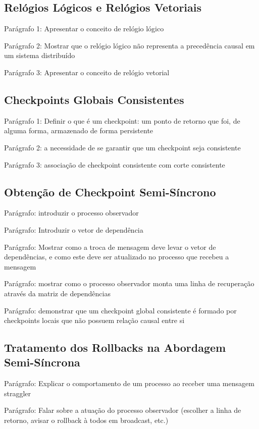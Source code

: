 \subsection{Relógios Lógicos e Relógios Vetoriais}

Parágrafo 1: Apresentar o conceito de relógio lógico

Parágrafo 2: Mostrar que o relógio lógico não representa a precedência causal em um sistema distribuído

Parágrafo 3: Apresentar o conceito de relógio vetorial

\subsection{Checkpoints Globais Consistentes}

Parágrafo 1: Definir o que é um checkpoint: um ponto de retorno que foi, de alguma forma, armazenado de forma persistente

Parágrafo 2: a necessidade de se garantir que um checkpoint seja consistente

Parágrafo 3: associação de checkpoint consistente com corte consistente

\subsection{Obtenção de Checkpoint Semi-Síncrono}

Parágrafo: introduzir o processo observador

Parágrafo: Introduzir o vetor de dependência

Parágrafo: Mostrar como a troca de mensagem deve levar o vetor de dependências, e como este deve ser atualizado no processo que recebeu a mensagem

Parágrafo: mostrar como o processo observador monta uma linha de recuperação através da matriz de dependências

Parágrafo: demonstrar que um checkpoint global consistente é formado por checkpoints locais que não possuem relação causal entre si


\subsection{Tratamento dos Rollbacks na Abordagem Semi-Síncrona}

Parágrafo: Explicar o comportamento de um processo ao receber uma mensagem straggler 

Parágrafo: Falar sobre a atuação do processo observador (escolher a linha de retorno, avisar o rollback à todos em broadcast, etc.)

